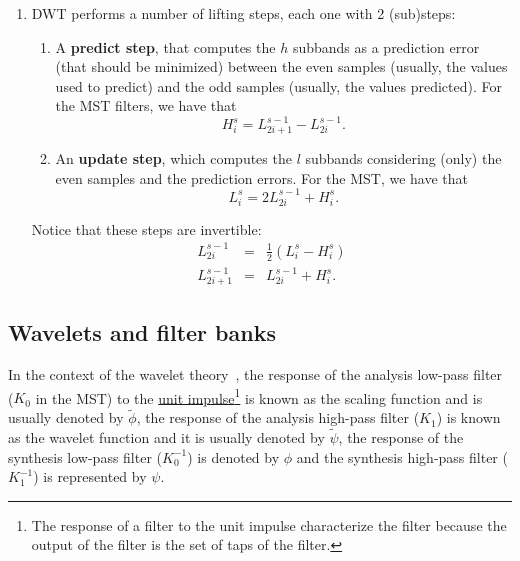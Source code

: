 \begin{enumerate}
\item DWT performs a number of lifting steps, each one with
  2 (sub)steps:
  \begin{enumerate}
  \item A \textbf{predict step}, that computes the $h$ subbands as a
    prediction error (that should be minimized) between the even
    samples (usually, the values used to predict) and the odd samples
    (usually, the values predicted). For the MST filters, we have that
    \begin{equation}
      H^s_i = L^{s-1}_{2i+1} - L^{s-1}_{2i}.
    \end{equation}
    
  \item An \textbf{update step}, which computes the $l$ subbands
    considering (only) the even samples and the prediction errors. For
    the MST, we have that
    \begin{equation}
      L^s_i = 2L^{s-1}_{2i} + H^s_i.
    \end{equation}
  \end{enumerate}

  Notice that these steps are invertible:
  \begin{equation}
    \begin{array}{rcl}
      L^{s-1}_{2i} & = & \frac{1}{2}(L^s_i - H^s_i)\\
      L^{s-1}_{2i+1} & = & L^{s-1}_{2i} + H^s_i.
    \end{array}
  \end{equation}

\end{enumerate}

\subsection{Wavelets and filter banks}
In the context of the wavelet theory~\cite{burrus2013wavelets}, the
response of the analysis low-pass filter ($K_0$ in the MST) to the
\href{https://en.wikipedia.org/?title=Unit_impulse&redirect=no}{unit
  impulse}\footnote{The response of a filter to the unit impulse
  characterize the filter because the output of the filter is the set
  of taps of the filter.} is known as the scaling function and is
usually denoted by $\tilde\phi$, the response of the analysis high-pass
filter ($K_1$) is known as the wavelet function and it is usually
denoted by $\tilde\psi$, the response of the synthesis low-pass filter
($K^{-1}_0$) is denoted by $\phi$ and the synthesis high-pass
filter ($K^{-1}_1$) is represented by $\psi$.

